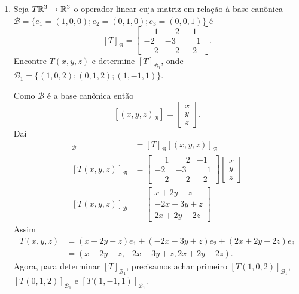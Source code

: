\begin{exemplos}
\begin{enumerate}[label={\arabic*})]
        \item Seja $T \mathbb{R}^3 \to \mathbb{R}^3$ o operador linear cuja matriz em relação à base canônica $\mathcal{B} = \{e_1 = (1, 0, 0); e_2 = (0, 1, 0); e_3 = (0, 0, 1)\}$ é
        \[
            [T]_\mathcal{B} = \begin{bmatrix}\phantom{-}1 & \phantom{-}2 & -1\\-2 & -3 & \phantom{-}1\\\phantom{-}2 & \phantom{-}2 & -2\end{bmatrix}.
        \]
        Encontre $T(x, y, z)$ e determine $[T]_{\mathcal{B}_1}$, onde ${\mathcal{B}_1} = \{(1, 0, 2); (0, 1, 2); (1, -1, 1)\}$.
        \begin{solucao}
            Como $\mathcal{B}$ é a base canônica então
            \[
              [(x, y, z)_\mathcal{B}] = \begin{bmatrix}x\\y\\z\end{bmatrix}.
            \]
            Daí
            \begin{align*}
                [T(x, y, z)]_\mathcal{B} &= [T]_\mathcal{B}[(x, y, z)]_\mathcal{B}\\
                [T(x, y, z)]_\mathcal{B} &= \begin{bmatrix}\phantom{-}1 & \phantom{-}2 & -1\\-2 & -3 & \phantom{-}1\\\phantom{-}2 & \phantom{-}2 & -2\end{bmatrix}\begin{bmatrix}x \\ y \\ z\end{bmatrix}\\
                [T(x, y, z)]_\mathcal{B} &= \begin{bmatrix}x + 2y - z\\-2x - 3y + z\\2x + 2y - 2z\end{bmatrix}
            \end{align*}
            Assim
            \begin{align*}
                T(x, y, z) &= (x + 2y - z)e_1 + (-2x - 3y + z)e_2 + (2x + 2y - 2z)e_3 \\ &= (x + 2y - z, -2x - 3y + z, 2x + 2y - 2z).
            \end{align*}
            Agora, para determinar $[T]_{\mathcal{B}_1}$, precisamos achar primeiro $[T(1, 0, 2)]_{\mathcal{B}_1}$, $[T(0, 1, 2)]_{\mathcal{B}_1}$ e $[T(1, -1, 1)]_{\mathcal{B}_1}$.

\end{solucao}
\end{enumerate}
\end{exemplos}
